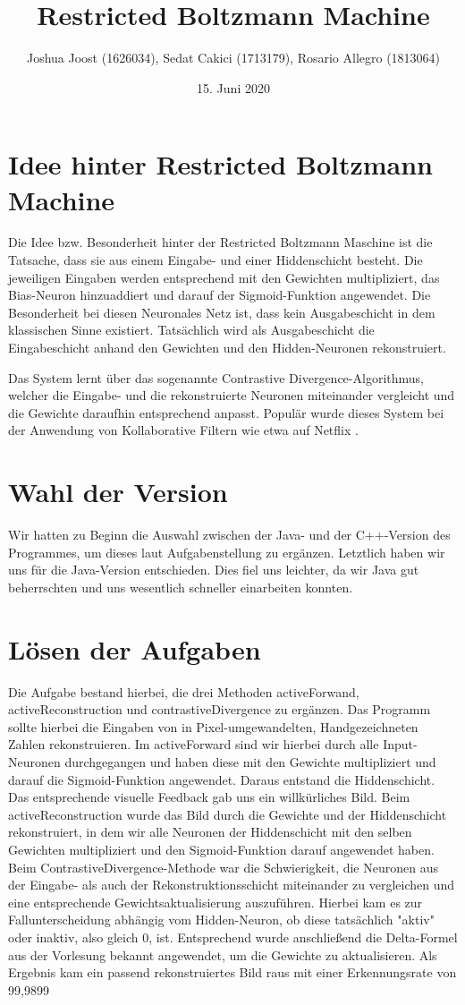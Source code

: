 \documentclass{article}
\title{Restricted Boltzmann Machine}
\author{Joshua Joost (1626034), Sedat Cakici (1713179), Rosario Allegro (1813064)}
\date{15. Juni 2020}
\begin{document}
\maketitle

\section{Idee hinter Restricted Boltzmann Machine}
Die Idee bzw. Besonderheit hinter der Restricted Boltzmann Maschine ist die Tatsache, dass sie aus einem Eingabe- und einer Hiddenschicht besteht. Die jeweiligen Eingaben werden entsprechend mit den Gewichten multipliziert, das Bias-Neuron hinzuaddiert und darauf der Sigmoid-Funktion angewendet. 
Die Besonderheit bei diesen Neuronales Netz ist, dass kein Ausgabeschicht in dem klassischen Sinne existiert. Tatsächlich wird als Ausgabeschicht die Eingabeschicht anhand den Gewichten und den Hidden-Neuronen rekonstruiert. 

Das System lernt über das sogenannte Contrastive Divergence-Algorithmus, welcher die Eingabe- und die rekonstruierte Neuronen miteinander vergleicht und die Gewichte daraufhin entsprechend anpasst. Populär wurde dieses System bei der Anwendung von Kollaborative Filtern wie etwa auf Netflix \cite{aristotle:physics}.

\section{Wahl der Version}
Wir hatten zu Beginn die Auswahl zwischen der Java- und der C++-Version des Programmes, um dieses laut Aufgabenstellung zu ergänzen. Letztlich haben wir uns für die Java-Version entschieden. Dies fiel uns leichter, da wir Java gut beherrschten und uns wesentlich schneller einarbeiten konnten.

\section{Lösen der Aufgaben}
Die Aufgabe bestand hierbei, die drei Methoden activeForwand, activeReconstruction und contrastiveDivergence zu ergänzen. Das Programm sollte hierbei die Eingaben von in Pixel-umgewandelten, Handgezeichneten Zahlen rekonstruieren. Im activeForward sind wir hierbei durch alle Input-Neuronen durchgegangen und haben diese mit den Gewichte multipliziert und darauf die Sigmoid-Funktion angewendet. Daraus entstand die Hiddenschicht. Das entsprechende visuelle Feedback gab uns ein willkürliches Bild. Beim activeReconstruction wurde das Bild durch die Gewichte und der Hiddenschicht rekonstruiert, in dem wir alle Neuronen der Hiddenschicht mit den selben Gewichten multipliziert und den Sigmoid-Funktion darauf angewendet haben. Beim ContrastiveDivergence-Methode war die Schwierigkeit, die Neuronen aus der Eingabe- als auch der Rekonstruktionsschicht miteinander zu vergleichen und eine entsprechende Gewichtsaktualisierung auszuführen. Hierbei kam es zur Fallunterscheidung abhängig vom Hidden-Neuron, ob diese tatsächlich "aktiv" oder inaktiv, also gleich 0, ist. Entsprechend wurde anschließend die Delta-Formel aus der Vorlesung bekannt angewendet, um die Gewichte zu aktualisieren. Als Ergebnis kam ein passend rekonstruiertes Bild raus mit einer Erkennungsrate von 99,9899 %
\end{document}
